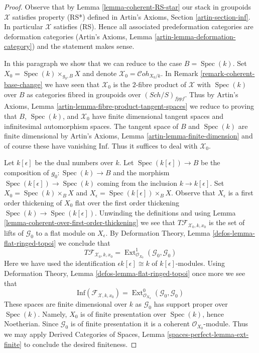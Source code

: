 \documentclass{stacks-project}
\theoremstyle{plain}
\theoremstyle{definition}
\theoremstyle{remark}
\numberwithin{equation}{subsection}
\def\Spec{\mathop{\mathrm{Spec}}}
\def\Ext{\mathop{\mathrm{Ext}}\nolimits}
\def\Sch{\mathit{Sch}}
\def\Cohstack{\mathcal{C}\!\mathit{oh}}
\begin{document}
\begin{proof}
Observe that by Lemma \ref{lemma-coherent-RS-star}
our stack in groupoids $\mathcal{X}$ satisfies property (RS*)
defined in Artin's Axioms, Section \ref{artin-section-inf}.
In particular $\mathcal{X}$ satisfies (RS).
Hence all associated predeformation
categories are deformation categories
(Artin's Axioms, Lemma \ref{artin-lemma-deformation-category})
and the statement makes sense.

\medskip\noindent
In this paragraph we show that we can reduce to the case $B = \Spec(k)$.
Set $X_0 = \Spec(k) \times_{g_0, B} X$
and denote $\mathcal{X}_0 = \Cohstack_{X_0/k}$. In
Remark \ref{remark-coherent-base-change} we have seen that
$\mathcal{X}_0$ is the $2$-fibre product of $\mathcal{X}$ with
$\Spec(k)$ over $B$ as categories fibred in groupoids over
$(\Sch/S)_{fppf}$. Thus by
Artin's Axioms, Lemma \ref{artin-lemma-fibre-product-tangent-spaces}
we reduce to proving that $B$, $\Spec(k)$, and $\mathcal{X}_0$
have finite dimensional tangent spaces and infinitesimal automorphism
spaces. The tangent space of $B$ and $\Spec(k)$ are finite dimensional by
Artin's Axioms, Lemma \ref{artin-lemma-finite-dimension}
and of course these have vanishing $\text{Inf}$.
Thus it suffices to deal with $\mathcal{X}_0$.

\medskip\noindent
Let $k[\epsilon]$ be the dual numbers over $k$.
Let $\Spec(k[\epsilon]) \to B$ be the composition of $g_0 : \Spec(k) \to B$
and the morphism $\Spec(k[\epsilon]) \to \Spec(k)$
coming from the inclusion $k \to k[\epsilon]$.
Set $X_0 = \Spec(k) \times_B X$ and
$X_\epsilon = \Spec(k[\epsilon]) \times_B X$.
Observe that $X_\epsilon$ is a first order thickening of $X_0$
flat over the first order thickening $\Spec(k) \to \Spec(k[\epsilon])$.
Unwinding the definitions and using
Lemma \ref{lemma-coherent-over-first-order-thickening}
we see that $T\mathcal{F}_{\mathcal{X}_0, k, x_0}$ is the set of
lifts of $\mathcal{G}_0$ to a flat module on $X_\epsilon$.
By Deformation Theory, Lemma \ref{defos-lemma-flat-ringed-topoi}
we conclude that
$$
T\mathcal{F}_{\mathcal{X}_0, k, x_0} =
\Ext^1_{\mathcal{O}_{X_0}}(\mathcal{G}_0, \mathcal{G}_0)
$$
Here we have used the identification $\epsilon k[\epsilon] \cong k$
of $k[\epsilon]$-modules. Using
Deformation Theory, Lemma \ref{defos-lemma-flat-ringed-topoi}
once more we see that
$$
\text{Inf}(\mathcal{F}_{\mathcal{X}, k, x_0}) =
\Ext^0_{\mathcal{O}_{X_0}}(\mathcal{G}_0, \mathcal{G}_0)
$$
These spaces are finite dimensional over $k$ as $\mathcal{G}_0$
has support proper over $\Spec(k)$. Namely, $X_0$ is of finite presentation
over $\Spec(k)$, hence Noetherian. Since $\mathcal{G}_0$ is of finite
presentation it is a coherent $\mathcal{O}_{X_0}$-module. Thus we may apply
Derived Categories of Spaces, Lemma
\ref{spaces-perfect-lemma-ext-finite}
to conclude the desired finiteness.
\end{proof}
\end{document}
